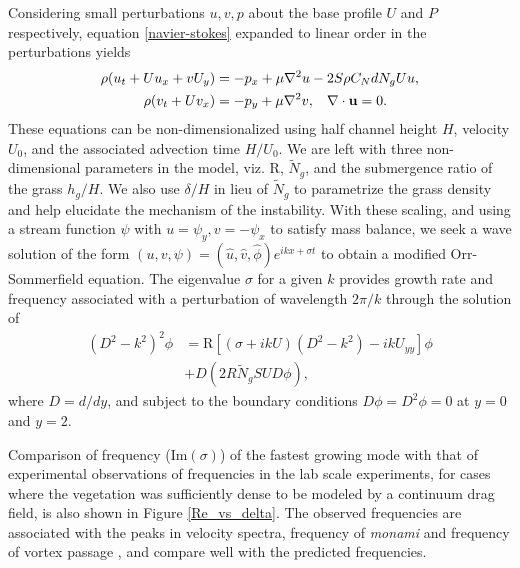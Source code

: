 \documentclass[aps,prl,reprint,twocolumn,showpacs,superscriptaddress,10pt]{revtex4-1}  %
\newcommand{\bu}{\mathbf{u}}
\newcommand{\Rey}{\text{R}}
\newcommand{\Ndg}{\tilde{N}_g}
\newcommand{\monami}{\textit{monami }}
\begin{document}
Considering small perturbations $u, v, p$ about the base profile $U$ and $P$ respectively, equation \eqref{navier-stokes} expanded to linear order in the perturbations yields
\begin{equation}
\begin{split}
\rho(u_t+U u_x+vU_y) &= -p_x+ {\mu}\nabla^2u-2S\rho C_{N}dN_{g}Uu, \\
\rho(v_t+ Uv_x) &= -p_y+ {\mu}\nabla^2v, \hspace{0.3cm} \nabla\cdot\bu=0.
\end{split}
\end{equation}
These equations can be non-dimensionalized using half channel height $H$, velocity $U_0$, and the associated advection time $H/U_0$. 
We are left with three non-dimensional parameters in the model, viz. $\Rey$, $\Ndg$, and the submergence ratio of the grass $h_g/H$. 
We also use $\delta/H$ in lieu of $\Ndg$ to parametrize the grass density and help elucidate the mechanism of the instability. 
With these scaling, and using a stream function $\psi$ with $u = \psi_{y}, v= -\psi_x$ to satisfy mass balance, we seek a wave solution of the form $\left(u,v,\psi \right)= \left(\hat u, \hat v, \hat\phi \right)e^{ikx+\sigma t}$ to  obtain a modified Orr-Sommerfield equation. 
The eigenvalue $\sigma$ for a given $k$ provides growth rate and frequency associated with a perturbation of wavelength $2\pi/k$ through the solution of
\begin{equation}
\begin{split}
\left(D^2 -k^{2} \right)^2\phi &= \Rey \left[ \left({\sigma}+ikU\right) \left(D^2-k^2\right) -ikU_{yy}\right]\phi \\
&+D\left(2R \Ndg S U D \phi\right),
\label{Orr-somerfield}
\end{split}
\end{equation}
where $D=d/dy$, and subject to the boundary conditions $D\phi = D^2\phi = 0$ at $y=0$ and $y=2$. 

Comparison of frequency (Im$(\sigma)$) of the fastest growing mode with that of experimental observations of frequencies in the lab scale experiments, for cases where the vegetation was sufficiently dense to be modeled by a continuum drag field, is also shown in Figure \ref{Re_vs_delta}. 
The observed frequencies are associated with the peaks in velocity spectra, frequency of \monami and frequency of vortex passage \cite{Ghisal02}, and compare well with the predicted frequencies. 
\end{document}
